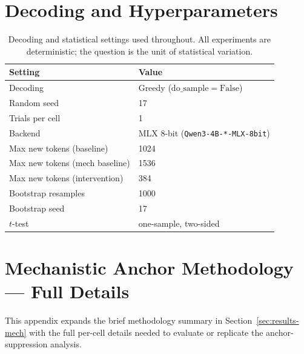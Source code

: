 \documentclass{article}
\theoremstyle{plain}
\theoremstyle{definition}
\theoremstyle{remark}
\begin{document}
\section{Decoding and Hyperparameters}
\label{app:hparams}

\begin{table}[h]
\centering
\small
\begin{tabular}{ll}
\toprule
Setting & Value \\
\midrule
Decoding & Greedy ($\mathrm{do\_sample}{=}\mathrm{False}$) \\
Random seed & 17 \\
Trials per cell & 1 \\
Backend & MLX 8-bit (\texttt{Qwen3-4B-*-MLX-8bit}) \\
Max new tokens (baseline) & 1024 \\
Max new tokens (mech baseline) & 1536 \\
Max new tokens (intervention) & 384 \\
Bootstrap resamples & 1000 \\
Bootstrap seed & 17 \\
$t$-test & one-sample, two-sided \\
\bottomrule
\end{tabular}
\caption{Decoding and statistical settings used throughout. All
experiments are deterministic; the question is the unit of statistical
variation.}
\label{tab:hparams}
\end{table}

\section{Mechanistic Anchor Methodology --- Full Details}
\label{app:mech-details}

This appendix expands the brief methodology summary in
Section~\ref{sec:results-mech} with the full per-cell details
needed to evaluate or replicate the anchor-suppression analysis.
\end{document}
